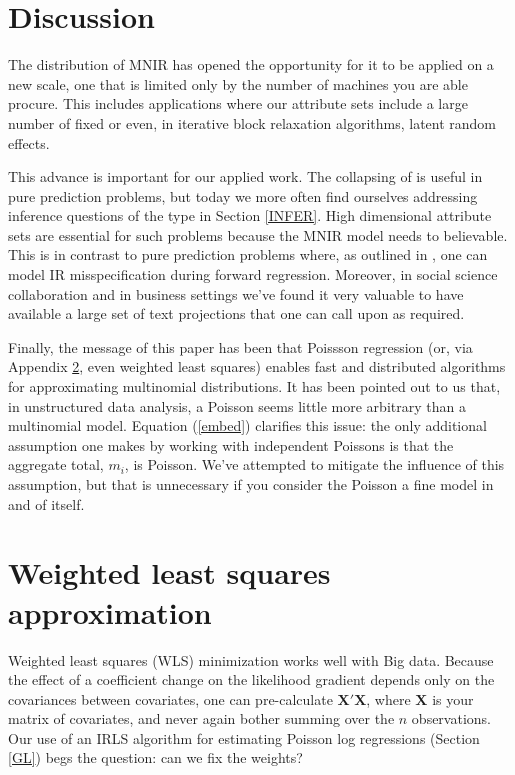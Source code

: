 \documentclass[12pt]{article}
\newcommand{\dbl}{\setstretch{1.5}}
\newcommand{\sgl}{\setstretch{1.1}}
\newcommand{\bm}[1]{\mathbf{#1}}
\begin{document}
\section{Discussion}
\label{END}

The distribution of MNIR has opened the opportunity for it to be applied on a new  scale, one that is limited only by the number of machines you are able procure.  This includes applications where our attribute sets include a large number of fixed or even, in iterative block relaxation algorithms, latent random effects.  

This advance is important for our applied work.  The collapsing of \cite{taddy_multinomial_2013} is useful in pure prediction problems, but today we more often find ourselves addressing inference questions  of the type in Section \ref{INFER}.  High dimensional attribute sets are essential for such problems because the MNIR model needs to believable. This is in contrast to pure prediction problems where, as outlined in \cite{taddy_rejoinder:_2013}, one can model IR misspecification during forward regression.  Moreover, in social science collaboration and in business settings we've found it very valuable to have available a large set of text projections that one can call upon as required.  

Finally, the message of this paper has been that Poissson regression (or, via
Appendix \ref{WLS}, even weighted least squares) enables fast and distributed
algorithms for approximating multinomial distributions.  It has been pointed
out to us that, in unstructured data analysis, a Poisson seems little more
arbitrary than a multinomial model.  Equation (\ref{embed}) clarifies
this issue:  the only additional assumption one makes by working with
independent Poissons is that the aggregate total, $m_i$, is Poisson.  We've
attempted to mitigate the influence of this assumption, but that is
unnecessary if you consider the Poisson a fine model in and of itself.


\sgl\small



\appendix
\dbl
\normalsize

\section{Weighted least squares approximation}
\label{WLS}

Weighted least squares (WLS) minimization works well with Big data.  Because the effect of a coefficient change on the likelihood gradient depends only on the covariances between covariates, one can pre-calculate $\bm{X}'\bm{X}$, where $\bm{X}$ is your matrix of covariates, and never again bother summing over the $n$ observations.
Our use of an IRLS algorithm for estimating Poisson log regressions (Section \ref{GL}) begs the question: can we fix the weights? 
\end{document}
